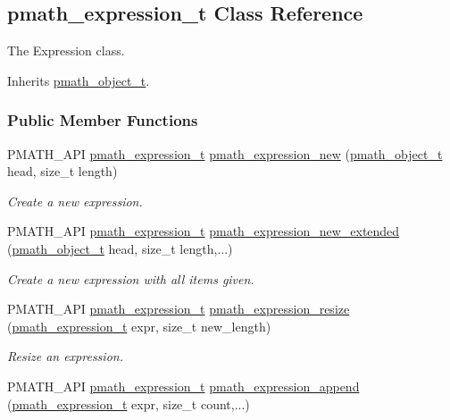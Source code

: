\hypertarget{classpmath__expression__t}{
\subsection{pmath\_\-expression\_\-t Class Reference}
\label{classpmath__expression__t}
}
The Expression class.  


Inherits \hyperlink{classpmath__object__t}{pmath\_\-object\_\-t}.

\subsubsection*{Public Member Functions}
\begin{CompactItemize}
\item 
PMATH\_\-API \hyperlink{classpmath__expression__t}{pmath\_\-expression\_\-t} \hyperlink{group__expressions_gdd5c08385781b3512f5d80309da1d0cd}{pmath\_\-expression\_\-new} (\hyperlink{classpmath__object__t}{pmath\_\-object\_\-t} head, size\_\-t length)
\begin{CompactList}\small\item\em Create a new expression. \item\end{CompactList}\item 
PMATH\_\-API \hyperlink{classpmath__expression__t}{pmath\_\-expression\_\-t} \hyperlink{group__expressions_g02d9b2de38b9a64846443f7299c456e2}{pmath\_\-expression\_\-new\_\-extended} (\hyperlink{classpmath__object__t}{pmath\_\-object\_\-t} head, size\_\-t length,...)
\begin{CompactList}\small\item\em Create a new expression with all items given. \item\end{CompactList}\item 
PMATH\_\-API \hyperlink{classpmath__expression__t}{pmath\_\-expression\_\-t} \hyperlink{group__expressions_ga7761cd2d56aa6fe3a91c9ea9025bca5}{pmath\_\-expression\_\-resize} (\hyperlink{classpmath__expression__t}{pmath\_\-expression\_\-t} expr, size\_\-t new\_\-length)
\begin{CompactList}\small\item\em Resize an expression. \item\end{CompactList}\item 
PMATH\_\-API \hyperlink{classpmath__expression__t}{pmath\_\-expression\_\-t} \hyperlink{group__expressions_g28eed1a67a5e7d7caf89b6a58f46f3b0}{pmath\_\-expression\_\-append} (\hyperlink{classpmath__expression__t}{pmath\_\-expression\_\-t} expr, size\_\-t count,...)

\end{CompactItemize}
